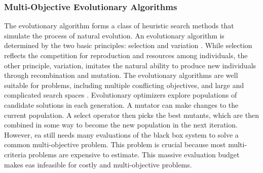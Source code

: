 

            \subsubsection{Multi-Objective Evolutionary Algorithms}
            The evolutionary algorithm forms a class of heuristic search methods that simulate the process of natural evolution. An evolutionary algorithm is determined by the two basic principles: selection and variation \cite{TutMOEABrockhoff}. While selection reflects the competition for reproduction and resources among individuals, the other principle, variation, imitates the natural ability to produce new individuals through recombination and mutation. 
            The evolutionary algorithms are well suitable for problems, including multiple conflicting objectives, and large and complicated search spaces \cite{Andersson00asurvey, RamirezRV19}.  Evolutionary optimizers explore populations of candidate solutions in each generation. A mutator can make changes to the current population. A select operator then picks the best mutants, which are then combined in some way to become the new population in the next iteration. However, \gls{ea} still needs many evaluations of the black box system to solve a common multi-objective problem. This problem is crucial because most multi-criteria problems are expensive to estimate. This massive evaluation budget makes \gls{ea}s infeasible for costly and multi-objective problems.  


